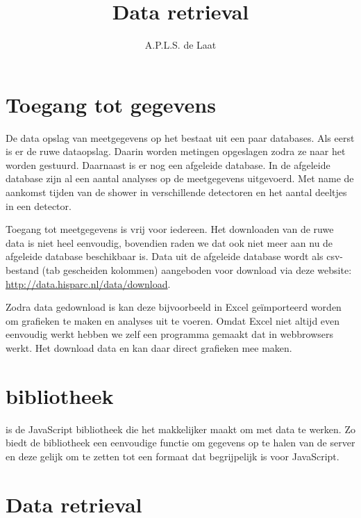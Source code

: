 

\title{Data retrieval}
\author{A.P.L.S. de Laat} 



\maketitle

\section{Toegang tot \hisparc gegevens}

De data opslag van \hisparc meetgegevens op het \nikhef bestaat uit een
paar databases. Als eerst is er de ruwe dataopslag. Daarin worden
metingen opgeslagen zodra ze naar het \nikhef worden gestuurd. Daarnaast
is er nog een afgeleide database. In de afgeleide database zijn al een
aantal analyses op de meetgegevens uitgevoerd. Met name de aankomst
tijden van de shower in verschillende detectoren en het aantal deeltjes
in een detector.

Toegang tot \hisparc meetgegevens is vrij voor iedereen. Het downloaden
van de ruwe data is niet heel eenvoudig, bovendien raden we dat ook niet
meer aan nu de afgeleide database beschikbaar is. Data uit de afgeleide
database wordt als csv-bestand (tab gescheiden kolommen) aangeboden voor
download via deze website: \url{http://data.hisparc.nl/data/download}.

Zodra data gedownload is kan deze bijvoorbeeld in Excel geïmporteerd
worden om grafieken te maken en analyses uit te voeren. Omdat Excel niet
altijd even eenvoudig werkt hebben we zelf een programma gemaakt dat in
webbrowsers werkt. Het download data en kan daar direct grafieken mee
maken.


\section{\jsparc bibliotheek}

\jsparc is de JavaScript bibliotheek die het makkelijker maakt om met
\hisparc data te werken. Zo biedt de bibliotheek een eenvoudige functie
om gegevens op te halen van de \hisparc server en deze gelijk om te
zetten tot een formaat dat begrijpelijk is voor JavaScript.


\section{Data retrieval}

